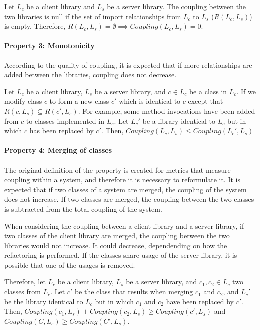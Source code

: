 Let $L_c$ be a client library and $L_s$ be a server library. The coupling between the two libraries is null if the set of import relationships from $L_c$ to $L_s$ ($R(L_c, L_s)$) is empty. Therefore, $R(L_c, L_s) = \emptyset \implies Coupling(L_c, L_s) = 0$.

\paragraph{Property 3: Monotonicity}
According to the quality of coupling, it is expected that if more relationships are added between the libraries, coupling does not decrease.

Let $L_c$ be a client library, $L_s$ be a server library, and $c \in L_c$ be a class in $L_c$. If we modify class $c$ to form a new class $c'$ which is identical to $c$ except that $R(c, L_s) \subseteq R(c', L_s)$. For example, some method invocations have been added from $c$ to classes implemented in $L_s$. Let $L_c'$ be a library identical to $L_c$ but in which $c$ has been replaced by $c'$. Then, $Coupling(L_c, L_s) \le Coupling(L_c', L_s)$

\paragraph{Property 4: Merging of classes}
The original definition of the property is created for metrics that measure coupling within a system, and therefore it is necessary to reformulate it. It is expected that if two classes of a system are merged, the coupling of the system does not increase. If two classes are merged, the coupling between the two classes is subtracted from the total coupling of the system.

When considering the coupling between a client library and a server library, if two classes of the client library are merged, the coupling between the two libraries would not increase. It could decrease, dependending on how the refactoring is performed. If the classes share usage of the server library, it is possible that one of the usages is removed.

Therefore, let $L_c$ be a client library, $L_s$ be a server library, and $c_1, c_2 \in L_c$ two classes from $L_c$. Let $c'$ be the class that results when merging  $c_1$ and $c_2$, and $L_c'$ be the library identical to $L_c$ but in which $c_1$ and $c_2$ have been replaced by $c'$. Then, $Coupling(c_1, L_s) + Coupling(c_2, L_s) \ge Coupling(c', L_s)$ and $Coupling(C, L_s) \ge Coupling(C', L_s)$.

